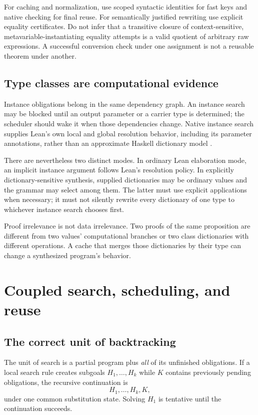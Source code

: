\documentclass[11pt,a4paper]{article}
\newcommand{\code}[1]{\texttt{\detokenize{#1}}}
\theoremstyle{remark}
\begin{document}
For caching and normalization, use scoped syntactic identities for fast keys and native checking for final reuse. For semantically justified rewriting use explicit equality certificates. Do not infer that a transitive closure of context-sensitive, metavariable-instantiating equality attempts is a valid quotient of arbitrary raw expressions. A successful conversion check under one assignment is not a reusable theorem under another.

\subsection{Type classes are computational evidence}

Instance obligations belong in the same dependency graph. An instance search may be blocked until an output parameter or a carrier type is determined; the scheduler should wake it when those dependencies change. Native instance search supplies Lean's own local and global resolution behavior, including its parameter annotations, rather than an approximate Haskell dictionary model \cite{lean-classes,lean-apply}.

There are nevertheless two distinct modes. In ordinary Lean elaboration mode, an implicit instance argument follows Lean's resolution policy. In explicitly dictionary-sensitive synthesis, supplied dictionaries may be ordinary values and the grammar may select among them. The latter must use explicit applications when necessary; it must not silently rewrite every dictionary of one type to whichever instance search chooses first.

Proof irrelevance is not data irrelevance. Two proofs of the same proposition are different from two \code{Decidable} values' computational branches or two class dictionaries with different operations. A cache that merges those dictionaries by their type can change a synthesized program's behavior.

\section{Coupled search, scheduling, and reuse}\label{sec:search}

\subsection{The correct unit of backtracking}

The unit of search is a partial program plus \emph{all} of its unfinished obligations. If a local search rule creates subgoals $H_1,\ldots,H_k$ while $K$ contains previously pending obligations, the recursive continuation is
\[
 H_1,\ldots,H_k,K,
\]
under one common substitution state. Solving $H_1$ is tentative until the continuation succeeds.
\end{document}

